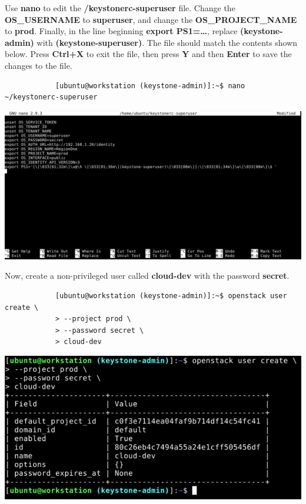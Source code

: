 \documentclass[letterpaper, 12pt]{article}
\begin{document}
\begin{enumerate}
    \begin{labstep}
        Use \textbf{nano} to edit the \textbf{\texttildemid/keystonerc-superuser} file.
        Change the \textbf{OS\_USERNAME} to \textbf{superuser}, and change the \textbf{OS\_PROJECT\_NAME} to \textbf{prod}.
        Finally, in the line beginning \textbf{export PS1=…}, replace \textbf{(keystone-admin)} with \textbf{(keystone-superuser)}.
        The file should match the contents shown below.
        Press \textbf{Ctrl+X} to exit the file, then press \textbf{Y} and then \textbf{Enter} to save the changes to the file.
        \begin{lstlisting}
            [ubuntu@workstation (keystone-admin)]:~$ nano ~/keystonerc-superuser
        \end{lstlisting}

        \begin{center}
            \includegraphics[width=\linewidth]{images/part1/step8.png}
        \end{center}
    \end{labstep}

    \begin{labstep}
        Now, create a non-privileged user called \textbf{cloud-dev} with the password \textbf{secret}.
        \begin{lstlisting}
            [ubuntu@workstation (keystone-admin)]:~$ openstack user create \
            > --project prod \
            > --password secret \
            > cloud-dev
        \end{lstlisting}

        \begin{center}
            \includegraphics[width=\linewidth]{images/part1/step9.png}
        \end{center}
    \end{labstep}


\end{enumerate}
\end{document}
